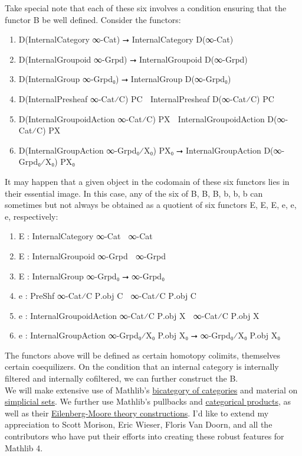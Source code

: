 \documentclass{book}
\theoremstyle{definition}
\begin{document}
Take special note that each of these six involves a condition ensuring that the functor B⃗ be well defined. Consider the functors:

\begin{enumerate}
\item D(InternalCategory ∞-Cat) ⭢ InternalCategory D(∞-Cat)
\item D(InternalGroupoid ∞-Grpd) ⭢ InternalGroupoid D(∞-Grpd)
\item D(InternalGroup ∞-Grpd₀) ⭢ InternalGroup D(∞-Grpd₀)
\item D(InternalPresheaf ∞-Cat⁄C) P⃗C ⭢ InternalPresheaf D(∞-Cat⁄C) P⃗C
\item D(InternalGroupoidAction ∞-Cat⁄C) P⃡X ⭢ InternalGroupoidAction D(∞-Cat⁄C) P⃡X
\item D(InternalGroupAction ∞-Grpd₀⁄X₀) PX₀ ⭢ InternalGroupAction D(∞-Grpd₀⁄X₀) PX₀
\end{enumerate}

It may happen that a given object in the codomain of these six functors lies in their essential image. In this case, any of the six of B⃗, B⃡, B, b⃗, b⃡, b can sometimes but not always be obtained as a quotient of six functors E⃗, E⃡, E, e⃗, e⃡, e, respectively:

\begin{enumerate}
\item E⃗ : InternalCategory ∞-Cat ⭢ ∞-Cat
\item E⃡ : InternalGroupoid ∞-Grpd ⭢ ∞-Grpd
\item E : InternalGroup ∞-Grpd₀ ⭢ ∞-Grpd₀
\item e⃗ : PreShf ∞-Cat⁄C P⃗.obj C ⭢ ∞-Cat⁄C P⃗.obj C
\item e⃡ : InternalGroupoidAction ∞-Cat⁄C P⃡.obj X ⭢ ∞-Cat⁄C P⃡.obj X
\item e : InternalGroupAction ∞-Grpd₀⁄X₀ P.obj X₀ ⭢ ∞-Grpd₀⁄X₀ P.obj X₀
\end{enumerate}

The functors above will be defined as certain homotopy colimits, themselves certain coequilizers. On the condition that an internal category is internally filtered and internally cofiltered, we can further construct the B⃗.\\

We will make extensive use of Mathlib's \href{https://leanprover-community.github.io/mathlib4_docs/Mathlib/CategoryTheory/Category/Cat.html#CategoryTheory.Cat.bicategory}{bicategory of categories} and material on \href{https://github.com/leanprover-community/mathlib4/blob/bd3e369b6f82c874de0f318c71d7e0595f8a3aa4//Mathlib/AlgebraicTopology/SimplicialSet.lean#L47-L48}{simplicial sets}. We further use Mathlib's pullbacks and \href{https://github.com/leanprover-community/mathlib4/blob/bd3e369b6f82c874de0f318c71d7e0595f8a3aa4/Mathlib/CategoryTheory/Products/Basic.lean}{categorical products}, as well as their \href{https://github.com/leanprover-community/mathlib4/blob/bd3e369b6f82c874de0f318c71d7e0595f8a3aa4/Mathlib/CategoryTheory/Monad/Algebra.lean}{Eilenberg-Moore theory constructions}. I'd like to extend my appreciation to Scott Morison, Eric Wieser, Floris Van Doorn, and all the contributors who have put their efforts into creating these robust features for Mathlib 4.\\
\end{document}
